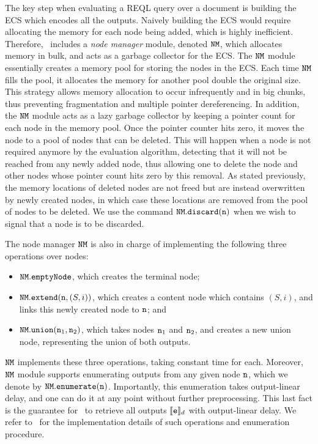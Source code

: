 The key step when evaluating a REQL query over a document is building the ECS
which encodes all the outputs. Naively building the ECS would require allocating
the memory for each node being added, which is highly inefficient. Therefore,
\rematch\ includes a \emph{node manager} module, denoted $\mathtt{NM}$, which allocates
memory in bulk, and acts as a garbage collector for the ECS. The $\mathtt{NM}$ module
essentially creates a memory pool for storing the nodes in the ECS. Each time
$\mathtt{NM}$ fills the pool, it allocates the memory for another pool double the
original size. This strategy allows memory allocation to occur infrequently and
in big chunks, thus preventing fragmentation and multiple pointer dereferencing.
In addition, the $\mathtt{NM}$ module acts as a lazy garbage collector by keeping a
pointer count for each node in the memory pool. Once the pointer counter hits
zero, it moves the node to a pool of nodes that can be deleted. This will happen
when a node is not required anymore by the evaluation algorithm, detecting that
it will not be reached from any newly added node, thus allowing one to delete
the node and other nodes whose pointer count hits zero by this removal.
As stated previously, the memory locations of deleted nodes are not freed but
are instead overwritten by newly created nodes, in which case these locations
are removed from the pool of nodes to be deleted. We use the command
$\mathtt{NM}.\texttt{discard}(\mathtt{n})$ when we wish to signal that a node is to be
discarded.


The node manager $\mathtt{NM}$ is also in charge of implementing the following three
operations over nodes:
\begin{itemize}
	\item $\mathtt{NM}.\texttt{emptyNode}$, which creates the terminal node;
	\item $\mathtt{NM}.\texttt{extend}(\mathtt{n},(S,i))$, which creates a content node which
	contains $(S,i)$, and links this newly created node to $\mathtt{n}$; and
	\item $\mathtt{NM}.\texttt{union}(\mathtt{n}_1,\mathtt{n}_2)$, which takes nodes $\mathtt{n}_1$ and
	$\mathtt{n}_2$, and creates a new union node, representing the union of both
	outputs.
\end{itemize}
$\mathtt{NM}$ implements these three operations, taking constant time for each.
Moreover, $\mathtt{NM}$ module supports enumerating outputs from any given node $\mathtt{n}$,
which we denote by $\mathtt{NM}.\texttt{enumerate}(\mathtt{n})$. Importantly, this enumeration takes
output-linear delay, and one can do it at any point without further
preprocessing. This last fact is the guarantee for \rematch\ to retrieve all
outputs $\llbracket\texttt{e}\rrbracket_d$ with output-linear delay. We refer
to~\citet{MunozR22} for the implementation details of such operations and
enumeration procedure. 



